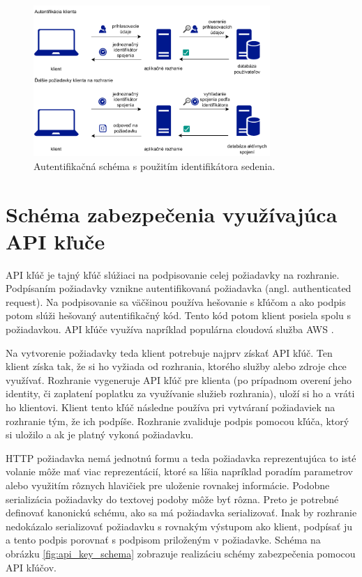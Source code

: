\begin{figure}
    \centerline{\includegraphics[width=0.8\textwidth]{images/session_schema}}
    \caption[Schéma s použitím identifikátora sedenia]{Autentifikačná schéma s použitím identifikátora sedenia.}
    \label{obr:session}
\end{figure}

\section{Schéma zabezpečenia využívajúca API kľuče}

API kľúč je tajný kľúč slúžiaci na podpisovanie celej požiadavky na rozhranie. Podpísaním požiadavky vznikne autentifikovaná požiadavka (angl. authenticated request). Na podpisovanie sa väčšinou používa hešovanie s kľúčom a ako podpis potom slúži hešovaný autentifikačný kód. Tento kód potom klient posiela spolu s požiadavkou. API kľúče využíva napríklad populárna cloudová služba AWS \cite{aws_auth}.

Na vytvorenie požiadavky teda klient potrebuje najprv získať API kľúč. Ten klient získa tak, že si ho vyžiada od rozhrania, ktorého služby alebo zdroje chce využívať. Rozhranie vygeneruje API kľúč pre klienta (po prípadnom overení jeho identity, či zaplatení poplatku za využívanie služieb rozhrania), uloží si ho a vráti ho klientovi. Klient tento kľúč následne používa pri vytváraní požiadaviek na rozhranie tým, že ich podpíše. Rozhranie zvaliduje podpis pomocou kľúča, ktorý si uložilo a ak je platný vykoná požiadavku.

HTTP požiadavka nemá jednotnú formu a teda požiadavka reprezentujúca to isté volanie môže mať viac reprezentácií, ktoré sa líšia napríklad poradím parametrov alebo využitím rôznych hlavičiek pre uloženie rovnakej informácie. Podobne serializácia požiadavky do textovej podoby môže byť rôzna. Preto je potrebné definovať kanonickú schému, ako sa má požiadavka serializovať. Inak by rozhranie nedokázalo serializovať požiadavku s rovnakým výstupom ako klient, podpísať ju a tento podpis porovnať s podpisom priloženým v požiadavke. Schéma na obrázku \ref{fig:api_key_schema} zobrazuje realizáciu schémy zabezpečenia pomocou API kľúčov.

